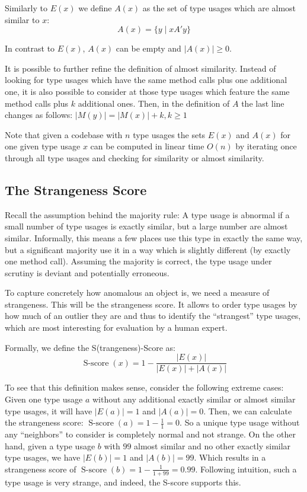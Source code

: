 Similarly to $E(x)$ we define $A(x)$ as the set of type usages which are almost similar to $x$:
\begin{equation*}
A(x) = \{y \mid xA'y \}
\end{equation*}


In contrast to $E(x)$, $A(x)$ can be empty and $|A(x)|\geq0$.

It is possible to further refine the definition of almost similarity.
Instead of looking for type usages which have the same method calls plus one additional one, it is also possible to consider at those type usages which feature the same method calls plus $k$ additional ones.
Then, in the definition of $A$ the last line changes as follows: $|M(y)| = |M(x)| + k, k\geq1$

Note that given a codebase with $n$ type usages the sets $E(x)$ and $A(x)$ for one given type usage $x$ can be computed in linear time $O(n)$ by iterating once through all type usages and checking for similarity or almost similarity.

\subsection{The Strangeness Score}

Recall the assumption behind the majority rule: A type usage is abnormal if a small number of type usages is exactly similar, but a large number are almost similar.
Informally, this means a few places use this type in exactly the same way, but a significant majority use it in a way which is slightly different (by exactly one method call).
Assuming the majority is correct, the type usage under scrutiny is deviant and potentially erroneous.

To capture concretely how anomalous an object is, we need a measure of strangeness.
This will be the strangeness score.
It allows to order type usages by how much of an outlier they are and thus to identify the ``strangest'' type usages, which are most interesting for evaluation by a human expert.

Formally, we define the S(trangeness)-Score as:
\begin{equation*}
    \operatorname{S-score}(x) = 1 - \frac{|E(x)|}{|E(x)|+|A(x)|}
\end{equation*}

To see that this definition makes sense, consider the following extreme cases:
Given one type usage $a$ without any additional exactly similar or almost similar type usages, it will have $|E(a)| = 1$ and $|A(a)| = 0$.
Then, we can calculate the strangeness score: $\operatorname{S-score}(a) = 1-\frac{1}{1} = 0$.
So a unique type usage without any ``neighbors'' to consider is completely normal and not strange.
On the other hand, given a type usage $b$ with $99$ almost similar and no other exactly similar type usages, we have $|E(b)| = 1$ and $|A(b)| = 99$.
Which results in a strangeness score of $\operatorname{S-score}(b) = 1-\frac{1}{1+99} = 0.99$.
Following intuition, such a type usage is very strange, and indeed, the S-score supports this.

